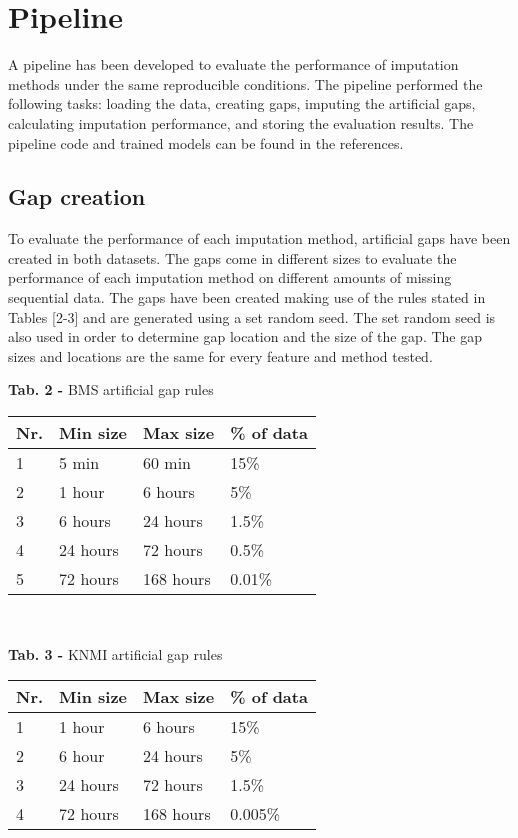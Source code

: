 \documentclass[9.5pt,article,twocolumn]{article}
\begin{document}
\section{Pipeline}
A pipeline has been developed to evaluate the performance of imputation methods under the same reproducible conditions. The pipeline performed the following tasks: loading the data, creating gaps, imputing the artificial gaps, calculating imputation performance, and storing the evaluation results. The pipeline code and trained models can be found in the references. 

\subsection{Gap creation}
To evaluate the performance of each imputation method, artificial gaps have been created in both datasets. The gaps come in different sizes to evaluate the performance of each imputation method on different amounts of missing sequential data. The gaps have been created making use of the rules stated in Tables [2-3] and are generated using a set random seed. The set random seed is also used in order to determine gap location and the size of the gap. The gap sizes and locations are the same for every feature and method tested.

\begin{flushleft}
\begingroup
    \fontsize{9pt}{5pt}\selectfont
\textbf{Tab. 2 -} BMS artificial gap rules
\endgroup
\begin{tabular}{llll}
 \hline
 Nr. & Min size & Max size & \% of data \\ 
 \hline
 1 & 5 min & 60 min & 15\% \\
 2 & 1 hour & 6 hours & 5\% \\
 3 & 6 hours & 24 hours & 1.5\% \\
 4 & 24 hours & 72 hours & 0.5\% \\
 5 & 72 hours & 168 hours & 0.01\% \\
 \hline
\end{tabular}
\end{flushleft}
\\

\clearpage
\begin{flushleft}
\begingroup
    \fontsize{9pt}{5pt}\selectfont
\textbf{Tab. 3 -} KNMI artificial gap rules

\endgroup
\begin{tabular}{l l l l}
 \hline
 Nr. & Min size & Max size & \% of data \\ 
 \hline
 1 & 1 hour & 6 hours & 15\% \\
 2 & 6 hour & 24 hours & 5\% \\
 3 & 24 hours & 72 hours & 1.5\% \\
 4 & 72 hours & 168 hours & 0.005\% \\
 \hline

\end{tabular}
\end{flushleft}
\end{document}
